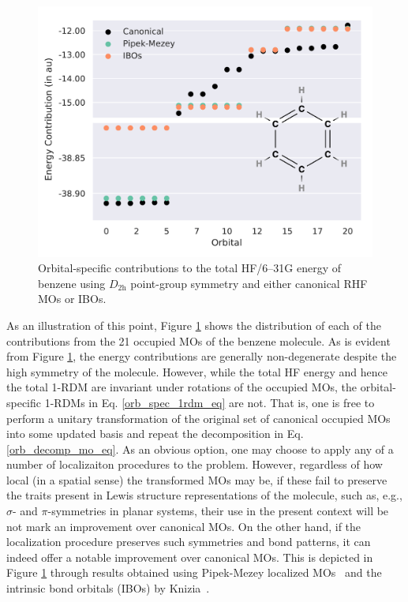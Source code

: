 \documentclass[journal=jctc,manuscript=article]{achemso}
\begin{document}
%
\begin{figure}[ht]
\begin{center}
\includegraphics[width=\textwidth]{figures/c6h6_hf_2.pdf}
\caption{Orbital-specific contributions to the total HF/6--31G energy of benzene using $D_{2\text{h}}$ point-group symmetry and either canonical RHF MOs or IBOs.}
\label{c6h6_hf_fig}
\end{center}
\end{figure}
%
As an illustration of this point, Figure \ref{c6h6_hf_fig} shows the distribution of each of the contributions from the 21 occupied MOs of the benzene molecule. As is evident from Figure \ref{c6h6_hf_fig}, the energy contributions are generally non-degenerate despite the high symmetry of the molecule. However, while the total HF energy and hence the total 1-RDM are invariant under rotations of the occupied MOs, the orbital-specific 1-RDMs in Eq. \ref{orb_spec_1rdm_eq} are not. That is, one is free to perform a unitary transformation of the original set of canonical occupied MOs into some updated basis and repeat the decomposition in Eq. \ref{orb_decomp_mo_eq}. As an obvious option, one may choose to apply any of a number of localizaiton procedures to the problem. However, regardless of how local (in a spatial sense) the transformed MOs may be, if these fail to preserve the traits present in Lewis structure representations of the molecule, such as, e.g., $\sigma$- and $\pi$-symmetries in planar systems, their use in the present context will be not mark an improvement over canonical MOs. On the other hand, if the localization procedure preserves such symmetries and bond patterns, it can indeed offer a notable improvement over canonical MOs. This is depicted in Figure \ref{c6h6_hf_fig} through results obtained using Pipek-Mezey localized MOs~\cite{pipek_mezey_jcp_1989} and the intrinsic bond orbitals (IBOs) by Knizia~\cite{knizia_iao_ibo_jctc_2013}.\\
\end{document}
